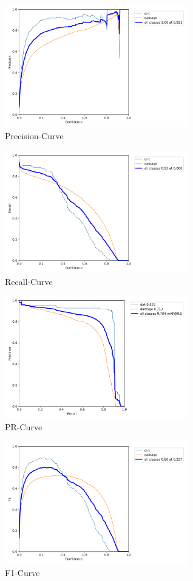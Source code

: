 \documentclass[conference]{IEEEtran}
\begin{document}
\begin{figure}[H]
    \centering
    \includegraphics[width=8cm]{Images/YOLOv5L/P_curve.png}
    \caption{Precision-Curve}
\end{figure}
\begin{figure}[H]
    \centering
    \includegraphics[width=8cm]{Images/YOLOv5L/R_curve.png}
    \caption{Recall-Curve}
\end{figure}
\begin{figure}[H]
    \centering
    \includegraphics[width=8cm]{Images/YOLOv5L/PR_curve.png}
    \caption{PR-Curve}
\end{figure}
\begin{figure}[H]
    \centering
    \includegraphics[width=8cm]{Images/YOLOv5L/F1_curve.png}
    \caption{F1-Curve}
\end{figure}
\end{document}
